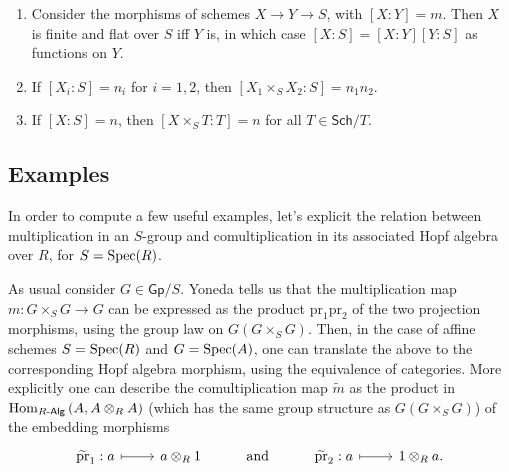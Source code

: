 \begin{prop}\leavevmode\vspace{-.2\baselineskip}
\begin{enumerate}
	\item Consider the morphisms of schemes $X \to Y \to S$, with $[X:Y] = m$.
		Then $X$ is finite and flat over $S$ iff $Y$ is, in which case
		$[X:S] = [X:Y] [Y:S]$ as functions on $Y$.
		
	\item If $[X_i:S] = n_i$ for $i=1,2$, then
		$[X_1 \times_{ S } X_2 : S] = n_1n_2$.

	\item If $[X:S] = n$, then $[X \times_{ S } T : T] = n$
		for all $T \in \mathsf{Sch}/T$.
\end{enumerate}
\end{prop}


\subsection{Examples}
In order to compute a few useful examples, let's explicit the relation between
multiplication in an $S$-group and comultiplication in its associated Hopf algebra over
$R$, for $S = \operatorname{Spec}(R)$.
\begin{rem}\label{rem:ExplicitComult}
	As usual consider \(G \in \mathsf{Gp}/S\).
	Yoneda tells us that the multiplication map 
	$m\colon G \times_S G \to G$ can be expressed
	as the product $\mathrm{pr}_1 \mathrm{pr}_2$
	of the two projection morphisms, using the group law
	on $G(G \times_S G)$.
	Then, in the case of affine schemes $S = \operatorname{Spec}(R)$
	and $G = \operatorname{Spec}(A)$, one can translate the above to the corresponding
	Hopf algebra morphism, using the equivalence of categories.
	More explicitly one can describe the comultiplication map
	$\widetilde{m}$ as the product in 
	$\operatorname{Hom}_{R\text{-}\mathsf{Alg}} \left( A, A \otimes_R A \right)$ 
	(which has the same group structure as $G(G \times_S G)$)
	of the embedding morphisms
	\begin{equation*}
	\begin{tikzcd}
		\widetilde{\mathrm{pr}}_1: a \arrow[r, "", mapsto] &
		a \otimes_R 1 &
		\text{and} &
		\widetilde{\mathrm{pr}}_2: a \arrow[r, "", mapsto] &
		1 \otimes_R a
	.\end{tikzcd}
	\end{equation*}
\end{rem}



